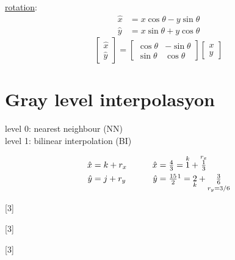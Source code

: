 \documentclass[11pt,a4paper]{article}
\begin{document}
\underline{rotation}:
\begin{align*}
\hat{x} &= x\cos\theta - y\sin\theta\\
\hat{y} &= x\sin\theta + y\cos\theta
\end{align*}
\[
\begin{bmatrix}\hat{x}\\ \hat{y}\end{bmatrix}
= \begin{bmatrix}\cos\theta & -\sin\theta\\ \sin\theta & \cos\theta\end{bmatrix}
\begin{bmatrix}x\\ y\end{bmatrix}
\]

\section{Gray level interpolasyon}
level 0: nearest neighbour (NN) \\
level 1: bilinear interpolation (BI)

\begin{align*}
\hat{x} &= k + r_x & \qquad \hat{x} &= \tfrac{4}{3} = \overset{k}{1} + \overset{r_x}{\tfrac{1}{3}}\\
\hat{y} &= j + r_y & \qquad \hat{y} &= \tfrac{15}{2}\footnotemark = \underset{k}{2} + \underset{r_y=3/6}{\tfrac{3}{6}}
\end{align*}

[3]

[3]

[3]

\end{document}
